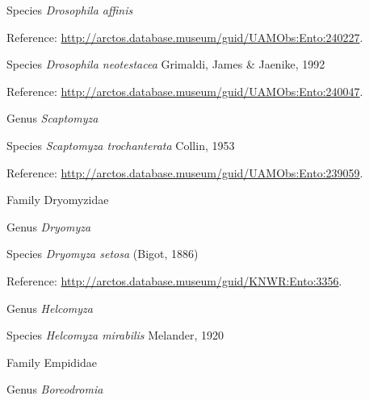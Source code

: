 \documentclass[9pt, article]{memoir}
\begin{document}
\begin{multicols}{2}
\vspace{6pt}\noindent\hspace{36pt}Species \textit{Drosophila affinis}


\vspace{6pt}Reference: 
\url{http://arctos.database.museum/guid/UAMObs:Ento:240227}.

\vspace{6pt}\noindent\hspace{36pt}Species \textit{Drosophila neotestacea} Grimaldi, James \& Jaenike, 1992


\vspace{6pt}Reference: 
\url{http://arctos.database.museum/guid/UAMObs:Ento:240047}.

\vspace{6pt}\noindent\hspace{30pt}Genus \textit{Scaptomyza}


\vspace{6pt}\noindent\hspace{36pt}Species \textit{Scaptomyza trochanterata} Collin, 1953


\vspace{6pt}Reference: 
\url{http://arctos.database.museum/guid/UAMObs:Ento:239059}.

\vspace{6pt}\noindent\hspace{24pt}Family Dryomyzidae


\vspace{6pt}\noindent\hspace{30pt}Genus \textit{Dryomyza}


\vspace{6pt}\noindent\hspace{36pt}Species \textit{Dryomyza setosa} (Bigot, 1886)


\vspace{6pt}Reference: 
\url{http://arctos.database.museum/guid/KNWR:Ento:3356}.

\vspace{6pt}\noindent\hspace{30pt}Genus \textit{Helcomyza}


\vspace{6pt}\noindent\hspace{36pt}Species \textit{Helcomyza mirabilis} Melander, 1920


\vspace{6pt}\noindent\hspace{24pt}Family Empididae


\vspace{6pt}\noindent\hspace{30pt}Genus \textit{Boreodromia}



\end{multicols}
\end{document}

